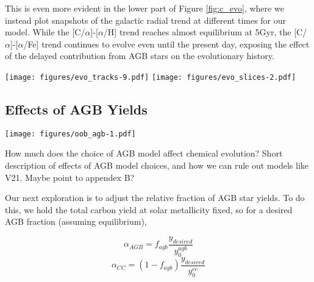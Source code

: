 \documentclass[fleqn,usenatbib]{mnras}
\begin{document}
This is even more evident in the lower part of Figure \ref{fig:c_evo}, where we instead plot snapshots of the galactic radial trend at different times for our model. While the [C/$\alpha$]-[$\alpha$/H] trend reaches almost equilibrium at 5Gyr, the [C/$\alpha$]-[$\alpha$/Fe] trend continues to evolve even until the present day, exposing the effect of the delayed contribution from AGB stars on the evolutionary history.

\begin{figure*}
\label{fig:c_evo}
\texttt{[image: figures/evo\_tracks-9.pdf]}
\texttt{[image: figures/evo\_slices-2.pdf]}
\caption{The top set of panes show the time evolution of the gas phase of our fiducial model, plotted as tracks through [C/O]-[O/H] and [C/O]-[O/Fe] where each colored line corresponds to the evolution at that galactic radius. 
The bottom set instead shows the galaxies gas-phase [C/O]-[O/H] and [C/O]-[O/Fe] trend at 5 different time slices. 
}
\end{figure*}




\subsection{Effects of AGB Yields}
\begin{figure*}
\texttt{[image: figures/oob\_agb-1.pdf]}

\caption{Abundance tracks for 4 different choices of AGB models. Each panel has different abundance ratios on the axis but is otherwise the same. The black points are Jack Roberts selection of APOGEE subgiants. Each model is plotted as a line representing the mean stellar abundance in each bin on x.}
\label{fig:stars_abundances}
\end{figure*}


How much does the choice of AGB model affect chemical evolution? 
Short description of effects of AGB model choices, and how we can rule out models like V21.  Maybe point to appendex B?


Our next exploration is to adjust the relative fraction of AGB star yields. To do this, we hold the total carbon yield at solar metallicity fixed, so for a desired AGB fraction (assuming equilibrium), 


\begin{equation}
    \alpha_{AGB} = f_{agb} \frac{y_{desired}}{y_0^{agb}}
\end{equation}
\begin{equation}
    \alpha_{CC} = (1 - f_{agb}) \frac{y_{desired}}{y_0^{cc}}
\end{equation}
\end{document}
